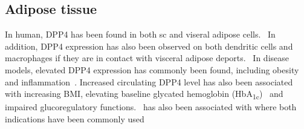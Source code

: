 \subsection{Adipose tissue}
In human, DPP4 has been found in both sc and viseral adipose cells.~\cite{Lamers2011} In addition, DPP4 expression has also been observed on both dendritic cells and macrophages if they are in contact with visceral adipose deports.~\cite{Zhong2013} In disease models, elevated DPP4 expression has commonly been found, including obesity and inflammation~\cite{Zhong2013}. Increased circulating DPP4 level has also been associated with increasing BMI, elevating baseline glycated hemoglobin (HbA\textsubscript{1c})~\cite{2011}  and impaired glucoregulatory functions.~\cite{Sell2013}  has also been associated with where both indications have been commonly used 